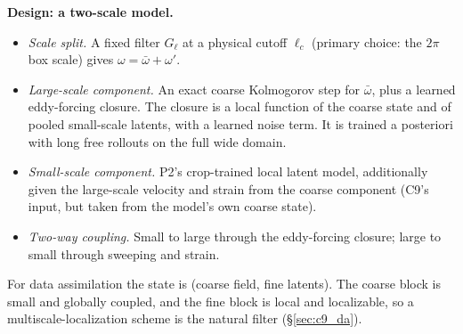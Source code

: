 \documentclass[11pt]{article}
\begin{document}
\textbf{Design: a two-scale model.}
\begin{itemize}[leftmargin=*]
\item \emph{Scale split.} A fixed filter $G_\ell$ at a physical cutoff
  $\ell_c$ (primary choice: the $2\pi$ box scale) gives
  $\omega=\bar\omega+\omega'$.
\item \emph{Large-scale component.} An exact coarse Kolmogorov step for
  $\bar\omega$, plus a learned eddy-forcing closure. The closure is a
  local function of the coarse state and of pooled small-scale latents,
  with a learned noise term. It is trained a posteriori with long free
  rollouts on the full wide domain.
\item \emph{Small-scale component.} P2's crop-trained local latent model,
  additionally given the large-scale velocity and strain from the coarse
  component (C9's input, but taken from the model's own coarse state).
\item \emph{Two-way coupling.} Small to large through the eddy-forcing
  closure; large to small through sweeping and strain.
\end{itemize}
For data assimilation the state is (coarse field, fine latents). The
coarse block is small and globally coupled, and the fine block is local
and localizable, so a multiscale-localization scheme is the natural
filter (\S\ref{sec:c9_da}).
\end{document}
